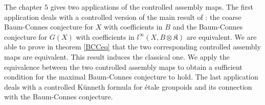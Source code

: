 The chapter $5$ gives two applications of the controlled assembly maps. The first application deals with a controlled version of the main result of \cite{SkTuYu} : the coarse Baum-Connes conjecture for $X$ with coefficients in $B$ and the Baum-Connes conjecture for $G(X)$ with coefficients in $l^\infty (X, B\otimes\mathfrak K)$ are equivalent. We are able to prove in theorem \ref{BCCeq} that the two corresponding controlled assembly maps are equivalent. This result induces the classical one. We apply the equivalence between the two controlled assembly maps to obtain a sufficient condition for the maximal Baum-Connes conjecture to hold. The last application deals with a controlled Künneth formula for étale groupoids and its connection with the Baum-Connes conjecture.  \\  













































